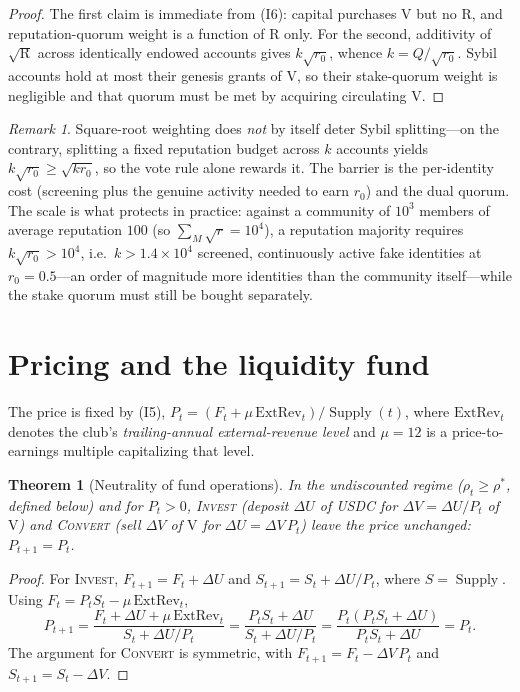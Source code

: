 \documentclass[11pt]{article}
\theoremstyle{plain}
\newtheorem{theorem}{Theorem}
\theoremstyle{definition}
\theoremstyle{remark}
\newtheorem{remark}{Remark}
\newcommand{\V}{\mathrm{V}}
\newcommand{\R}{\mathrm{R}}
\newcommand{\Supply}{\operatorname{Supply}}
\newcommand{\ExtRev}{\mathrm{ExtRev}}
\begin{document}
\begin{proof}
The first claim is immediate from (I6): capital purchases $\V$ but no $\R$, and reputation-quorum weight is a function of $\R$ only. For the second, additivity of $\sqrt{\R}$ across identically endowed accounts gives $k\sqrt{r_0}$, whence $k=Q/\sqrt{r_0}$. Sybil accounts hold at most their genesis grants of $\V$, so their stake-quorum weight is negligible and that quorum must be met by acquiring circulating $\V$.
\end{proof}

\begin{remark}
Square-root weighting does \emph{not} by itself deter Sybil splitting---on the contrary, splitting a fixed reputation budget across $k$ accounts yields $k\sqrt{r_0}\ge\sqrt{kr_0}$, so the vote rule alone rewards it. The barrier is the per-identity cost (screening plus the genuine activity needed to earn $r_0$) and the dual quorum. The scale is what protects in practice: against a community of $10^3$ members of average reputation $100$ (so $\sum_M\sqrt{r}=10^4$), a reputation majority requires $k\sqrt{r_0}>10^4$, i.e.\ $k>1.4\times10^4$ screened, continuously active fake identities at $r_0=0.5$---an order of magnitude more identities than the community itself---while the stake quorum must still be bought separately.
\end{remark}

\section{Pricing and the liquidity fund}

The price is fixed by (I5), $P_t = (F_t + \mu\,\ExtRev_t)/\Supply(t)$, where $\ExtRev_t$ denotes the club's \emph{trailing-annual external-revenue level} and $\mu = 12$ is a price-to-earnings multiple capitalizing that level.

\begin{theorem}[Neutrality of fund operations]\label{thm:neutrality}
In the undiscounted regime ($\rho_t\ge\rho^*$, defined below) and for $P_t>0$, \textnormal{\textsc{Invest}} (deposit $\Delta U$ of USDC for $\Delta V = \Delta U/P_t$ of $\V$) and \textnormal{\textsc{Convert}} (sell $\Delta V$ of $\V$ for $\Delta U = \Delta V\,P_t$) leave the price unchanged: $P_{t+1} = P_t$.
\end{theorem}

\begin{proof}
For \textsc{Invest}, $F_{t+1} = F_t + \Delta U$ and $S_{t+1} = S_t + \Delta U/P_t$, where $S=\Supply$. Using $F_t = P_t S_t - \mu\,\ExtRev_t$,
\[
P_{t+1} = \frac{F_t + \Delta U + \mu\,\ExtRev_t}{S_t + \Delta U/P_t}
= \frac{P_t S_t + \Delta U}{S_t + \Delta U/P_t}
= \frac{P_t(P_t S_t + \Delta U)}{P_t S_t + \Delta U} = P_t.
\]
The argument for \textsc{Convert} is symmetric, with $F_{t+1} = F_t - \Delta V\,P_t$ and $S_{t+1} = S_t - \Delta V$.
\end{proof}
\end{document}
